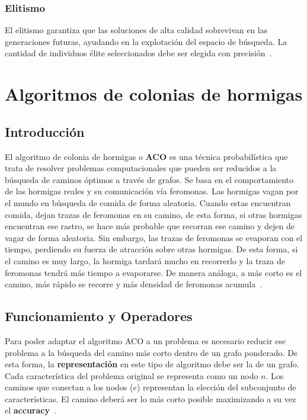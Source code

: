 \subsubsection{Elitismo}
El elitismo garantiza que las soluciones de alta calidad sobrevivan en las generaciones futuras, ayudando en la explotación del espacio de búsqueda. La cantidad de individuos élite seleccionados debe ser elegida con precisión~\cite{mirjalili2019genetic}.

\section{Algoritmos de colonias de hormigas}
\subsection{Introducción}
El algoritmo de colonia de hormigas o \textbf{ACO} es una técnica probabilística que trata de resolver problemas computacionales que pueden ser reducidos a la búsqueda de caminos óptimos a través de grafos. Se basa en el comportamiento de las hormigas reales y su comunicación vía feromonas. Las hormigas vagan por el mundo en búsqueda de comida de forma aleatoria. Cuando estas encuentran comida, dejan trazas de feromonas en su camino, de esta forma, si otras hormigas encuentran ese rastro, se hace más probable que recorran ese camino y dejen de vagar de forma aleatoria. Sin embargo, las trazas de feromonas se evaporan con el tiempo, perdiendo su fuerza de atracción sobre otras hormigas. De esta forma, si el camino es muy largo, la hormiga tardará mucho en recorrerlo y la traza de feromonas tendrá más tiempo a evaporarse. De manera análoga, a más corto es el camino, más rápido se recorre y más densidad de feromonas acumula~\cite{kashef_advanced_2015}.

\subsection{Funcionamiento y Operadores}
Para poder adaptar el algoritmo ACO a un problema es necesario reducir ese problema a la búsqueda del camino más corto dentro de un grafo ponderado. De esta forma, la \textbf{representación} en este tipo de algoritmo debe ser la de un grafo.
Cada característica del problema original se representa como un nodo $n$. Los caminos que conectan a los nodos ($e$) representan la elección del subconjunto de características. El camino deberá ser lo más corto posible maximizando a su vez el \textbf{accuracy}~\cite{kashef_advanced_2015}.

